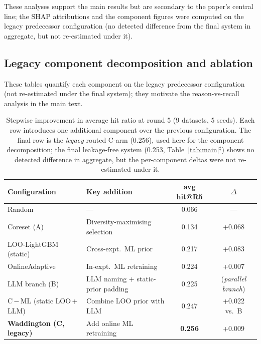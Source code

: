 \documentclass[11pt]{article}
\begin{document}
These analyses support the main results but are secondary to the paper's central line; the SHAP attributions and the component figures were computed on the legacy predecessor configuration (no detected difference from the final system in aggregate, but not re-estimated under it).

\subsection*{Legacy component decomposition and ablation}

These tables quantify each component on the legacy predecessor configuration (not re-estimated under the final system); they motivate the reason-vs-recall analysis in the main text.

\begin{table}[H]
\centering
\caption{%
  Stepwise improvement in average hit ratio at round 5 (9 datasets, 5 seeds).
  Each row introduces one additional component over the previous configuration.
  The final row is the \emph{legacy} routed C-arm (0.256), used here for the component decomposition; the
  final leakage-free system (0.253, Table~\ref{tab:main}$^\ddagger$) shows no detected difference in
  aggregate, but the per-component deltas were not re-estimated under it.
}
\label{tab:progression}
\begin{tabular}{llcc}
\toprule
Configuration & Key addition & avg hit@R5 & $\Delta$ \\
\midrule
Random                              & —                              & 0.066 & — \\
Coreset (A)                         & Diversity-maximising selection  & 0.134 & +0.068 \\
LOO-LightGBM (static)               & Cross-expt.\ ML prior           & 0.217 & +0.083 \\
OnlineAdaptive                      & In-expt.\ ML retraining         & 0.224 & +0.007 \\
LLM branch (B)                      & LLM naming $+$ static-prior padding & 0.225 & (\textit{parallel branch}) \\
C\,$-$\,ML (static LOO\,+\,LLM)    & Combine LOO prior with LLM      & 0.247 & +0.022 vs.\ B \\
\textbf{Waddington (C, legacy)}     & Add online ML retraining        & \textbf{0.256} & +0.009 \\
\bottomrule
\end{tabular}
\end{table}
\end{document}
